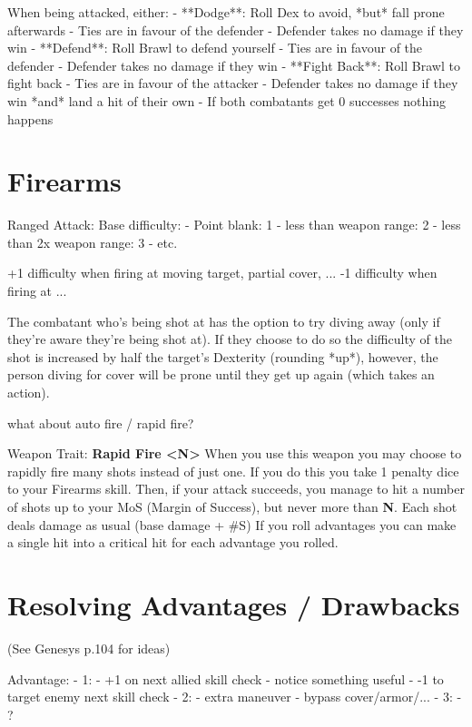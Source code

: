 When being attacked, either:
  - **Dodge**: Roll Dex to avoid, *but* fall prone afterwards
    - Ties are in favour of the defender
    - Defender takes no damage if they win
  - **Defend**: Roll Brawl to defend yourself
    - Ties are in favour of the defender
    - Defender takes no damage if they win
  - **Fight Back**: Roll Brawl to fight back  
    - Ties are in favour of the attacker
    - Defender takes no damage if they win *and* land a hit of their own
  - If both combatants get 0 successes nothing happens 


\section{Firearms}

Ranged Attack:  
Base difficulty: 
  - Point blank: 1
  - less than weapon range: 2
  - less than 2x weapon range: 3
  - etc.

+1 difficulty when firing at moving target, partial cover, ...
-1 difficulty when firing at ...

The combatant who's being shot at has the option to try diving away (only if they're aware they're being shot at). If they choose to do so the difficulty of the shot is increased by half the target's Dexterity (rounding *up*), however, the person diving for cover will be prone until they get up again (which takes an action).

what about auto fire / rapid fire?  

Weapon Trait: \textbf{Rapid Fire  <N>}
When you use this weapon you may choose to rapidly fire many shots instead of just one. If you do this you take 1 penalty dice to your Firearms skill. Then, if your attack succeeds, you manage to hit a number of shots up to your MoS (Margin of Success), but never more than \textbf{N}. Each shot deals damage as usual (base damage + \#S)
If you roll advantages you can make a single hit into a critical hit for each advantage you rolled.



\section{Resolving Advantages / Drawbacks}

(See Genesys p.104 for ideas)

Advantage:
  - 1:
    - +1 on next allied skill check
    - notice something useful
    - -1 to target enemy next skill check
  - 2:
    - extra maneuver
    - bypass cover/armor/...
  - 3:
    - ?

